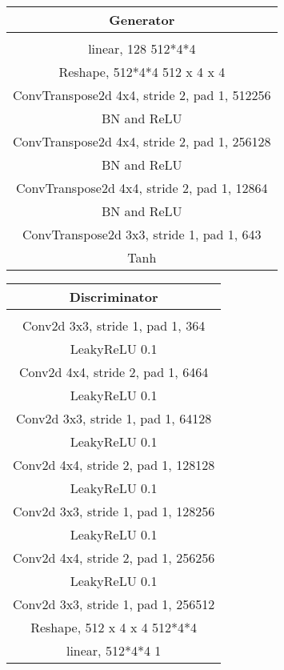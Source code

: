 \documentclass{article}
\begin{document}
\begin{center}
\begin{tabular}{c}
	Generator \\
	\toprule\midrule
	 \\
	\midrule
	linear, 128  512*4*4 \\
	\midrule
	Reshape, 512*4*4  512 x 4 x 4 \\
	\midrule
	ConvTranspose2d 4x4, stride 2, pad 1, 512256 \\
	\midrule
	BN and ReLU \\
	\midrule
	ConvTranspose2d 4x4, stride 2, pad 1, 256128 \\
	\midrule
	BN and ReLU \\
	\midrule
	ConvTranspose2d 4x4, stride 2, pad 1, 12864 \\
	\midrule
	BN and ReLU \\
	\midrule
	ConvTranspose2d 3x3, stride 1, pad 1, 643 \\
	\midrule
	Tanh \\
	\bottomrule
\end{tabular} 
\end{center}

\begin{center}
\begin{tabular}{c}
	Discriminator \\
	\toprule\midrule
	 \\
	\midrule
	Conv2d 3x3, stride 1, pad 1, 364 \\
	\midrule
	LeakyReLU 0.1 \\
	\midrule
	Conv2d 4x4, stride 2, pad 1, 6464 \\
	\midrule
	LeakyReLU 0.1 \\
	\midrule
	Conv2d 3x3, stride 1, pad 1, 64128 \\
	\midrule
	LeakyReLU 0.1 \\
	\midrule
	Conv2d 4x4, stride 2, pad 1, 128128 \\
	\midrule
	LeakyReLU 0.1 \\
	\midrule
	Conv2d 3x3, stride 1, pad 1, 128256 \\
	\midrule
	LeakyReLU 0.1 \\
	\midrule
	Conv2d 4x4, stride 2, pad 1, 256256 \\
	\midrule
	LeakyReLU 0.1 \\
	\midrule
	Conv2d 3x3, stride 1, pad 1, 256512 \\
	\midrule
	Reshape, 512 x 4 x 4  512*4*4 \\
	\midrule
	linear, 512*4*4  1 \\
	\bottomrule
\end{tabular}
\end{center}
\end{document}

